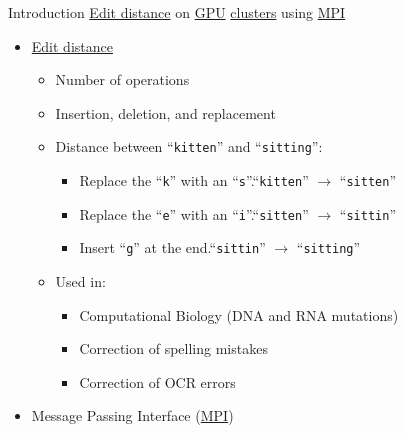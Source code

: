 \begin{frame}{Introduction}
\underline{Edit distance} on \underline{GPU} \underline{clusters} using \underline{MPI}

\begin{itemize}
    \item \underline{Edit distance}
    \begin{itemize}
        \item Number of operations
        \item Insertion, deletion, and replacement \pause
        \item Distance between ``\texttt{kitten}'' and ``\texttt{sitting}'':
        \begin{itemize}
                \item Replace the ``\texttt{k}'' with an ``\texttt{s}''.\hfill ``\texttt{kitten}'' $\rightarrow$ ``\texttt{sitten}'' $\qquad\enspace\qquad$
                \item Replace the ``\texttt{e}'' with an ``\texttt{i}''.\hfill ``\texttt{sitten}'' $\rightarrow$ ``\texttt{sittin}'' $\qquad\enspace\qquad$
                \item Insert ``\texttt{g}'' at the end.\hfill ``\texttt{sittin}'' $\rightarrow$ ``\texttt{sitting}'' $\qquad\qquad$ \pause
        \end{itemize}
        \item Used in:
        \begin{itemize}
            \item Computational Biology (DNA and RNA mutations)
            \item Correction of spelling mistakes
            \item Correction of OCR errors
        \end{itemize}
    \end{itemize} \pause
	\item Message Passing Interface (\underline{MPI})
\end{itemize}
\end{frame}


